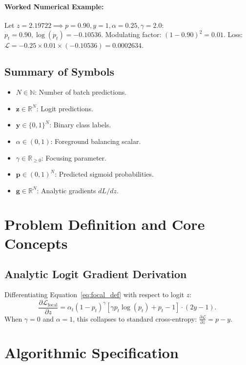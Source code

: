 \documentclass[11pt]{article}
\begin{document}
\paragraph{Worked Numerical Example:}
Let $z = 2.19722 \implies p = 0.90, y = 1, \alpha = 0.25, \gamma = 2.0$:
$p_t = 0.90, \log(p_t) = -0.10536$.
Modulating factor: $(1 - 0.90)^2 = 0.01$.
Loss: $\mathcal{L} = -0.25 \times 0.01 \times (-0.10536) = 0.0002634$.

\subsection{Summary of Symbols}
\begin{itemize}
    \item $N \in \mathbb{N}$: Number of batch predictions.
    \item $\mathbf{z} \in \mathbb{R}^N$: Logit predictions.
    \item $\mathbf{y} \in \{0, 1\}^N$: Binary class labels.
    \item $\alpha \in (0, 1)$: Foreground balancing scalar.
    \item $\gamma \in \mathbb{R}_{\ge 0}$: Focusing parameter.
    \item $\mathbf{p} \in (0, 1)^N$: Predicted sigmoid probabilities.
    \item $\mathbf{g} \in \mathbb{R}^N$: Analytic gradients $dL/dz$.
\end{itemize}

\section{Problem Definition and Core Concepts}
\label{sec:problem_definition}

\subsection{Analytic Logit Gradient Derivation}
Differentiating Equation~\eqref{eq:focal_def} with respect to logit $z$:
\begin{equation}
\frac{\partial \mathcal{L}_{\mathrm{focal}}}{\partial z} = \alpha_t (1 - p_t)^\gamma \left[ \gamma p_t \log(p_t) + p_t - 1 \right] \cdot (2y - 1).
\end{equation}
When $\gamma = 0$ and $\alpha = 1$, this collapses to standard cross-entropy: $\frac{\partial \mathcal{L}}{\partial z} = p - y$.

\section{Algorithmic Specification}
\label{sec:algorithm}
\end{document}
